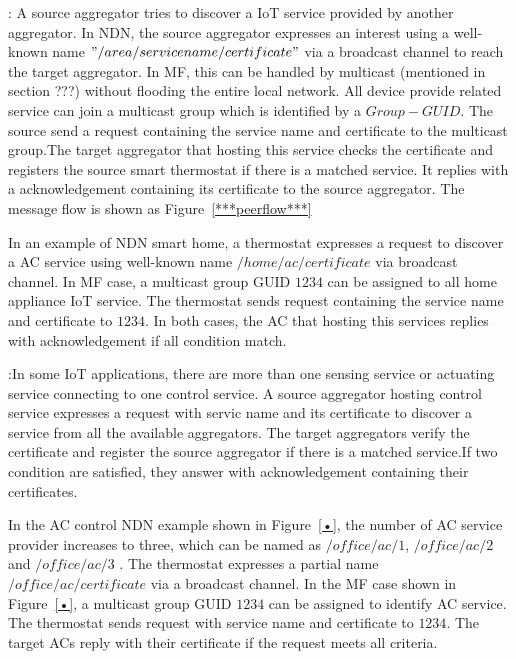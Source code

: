 \vspace{1mm}: A source aggregator tries to discover a IoT service provided by another aggregator. In NDN, the source aggregator expresses an interest using a well-known name $"/area/servicename/certificate"$ via a broadcast channel to reach the target aggregator. In MF, this can be handled by multicast (mentioned in section ???) without flooding the entire local network. All device provide related service can join a multicast group which is identified by a $Group-GUID$. The source send a request containing the service name and certificate to the multicast group.The target aggregator that hosting this service checks the certificate and registers the source smart thermostat if there is a matched service. It replies with a acknowledgement containing its certificate to the source aggregator.  The message flow is shown as Figure~\ref{***peerflow***}

In an example of NDN smart home, a thermostat expresses a request to discover a AC service using well-known name $/home/ac/certificate$ via broadcast channel. In MF case, a multicast group GUID $1234$ can be assigned to all home appliance IoT service. The thermostat sends request containing the service name and certificate to $1234$. In both cases, the AC that hosting this services replies with acknowledgement if all condition match.

\vspace{1mm}:In some IoT applications, there are more than one sensing service or actuating service connecting to one control service. A source aggregator hosting control service expresses a request with servic name and its certificate to discover a service from all the available aggregators. The target aggregators verify the certificate and register the source   aggregator if there is a matched service.If two condition are satisfied, they answer with acknowledgement containing their certificates.

In the AC control NDN example shown in Figure~\ref{•}, the number of AC service provider increases to three, which can be named as $/office/ac/1$, $/office/ac/2$ and $/office/ac/3$ . The thermostat expresses a partial name $/office/ac/certificate$ via a broadcast channel. In the MF case shown in Figure~\ref{•}, a multicast group GUID $1234$ can be assigned to identify AC service. The thermostat sends request with service name and certificate to $1234$. The target ACs reply with their certificate if the request meets all criteria.

